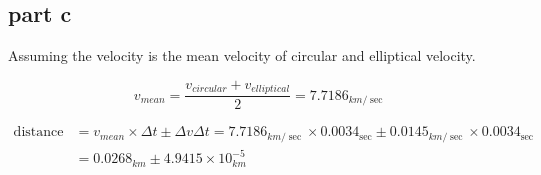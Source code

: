\subsection{part c}
Assuming the velocity is the mean velocity of circular and elliptical velocity.

$$
v_{mean} = \dfrac{v_{circular} + v_{elliptical}}{2} = 7.7186_{km/\sec}
$$

\begin{align*}
    \text{distance} &= v_{mean} \times \Delta t \pm \Delta v \Delta t = 7.7186_{km/\sec} \times 0.0034_{\sec} \pm 0.0145_{km/\sec} \times 0.0034_{\sec}  \\ &=0.0268_{km} \pm 4.9415\times 10^{-5}_{km}
\end{align*}
